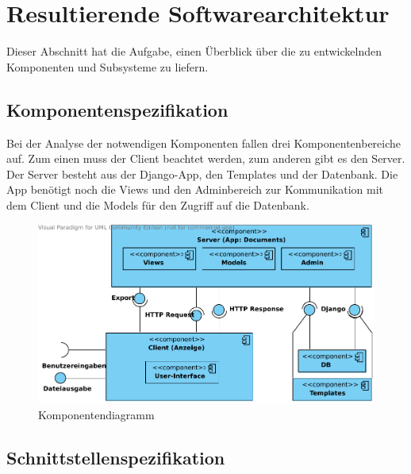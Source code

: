 \chapter{Resultierende Softwarearchitektur}

Dieser Abschnitt hat die Aufgabe, einen Überblick über die zu entwickelnden
Komponenten und Subsysteme zu liefern.
\section{Komponentenspezifikation}

Bei der Analyse der notwendigen Komponenten fallen drei Komponentenbereiche auf.
Zum einen muss der Client beachtet werden, zum anderen gibt es den Server. Der
Server besteht aus der Django-App, den Templates und der Datenbank. Die App
benötigt noch die Views und den Adminbereich zur Kommunikation mit dem Client
und die Models für den Zugriff auf die Datenbank.

\begin{figure}[h]
    \begin{center}
\includegraphics[width=0.8\linewidth]{bilder/Komponentendiagramm.pdf}
\caption[Komponentendiagramm]{Komponentendiagramm}
\label{Komponentendiagramm}
    \end{center}
\end{figure}

\section{Schnittstellenspezifikation}

